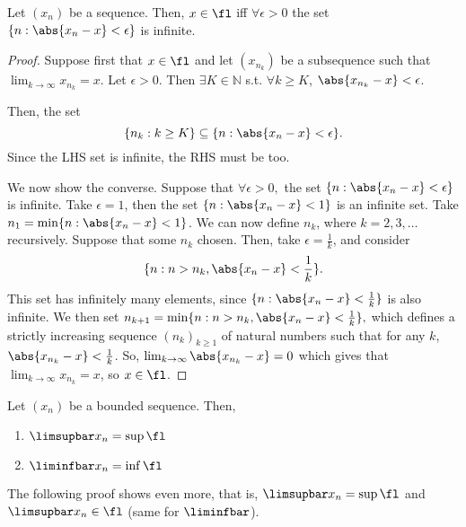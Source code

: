 \documentclass[12pt]{article}
\begin{document}
\begin{proposition}\label{prop:limitpointinifinite}
  Let $(x_n)$ be a sequence. Then, $x \in \fl$ iff $\forall \epsilon > 0$ the set $\{n : \abs{x_n - x} < \epsilon\}$ is infinite.
\end{proposition}

\begin{proof}
  Suppose first that $x \in \fl$ and let $(x_{n_k})$ be a subsequence such that $\lim_{k\to\infty} x_{n_k} = x$. Let $\epsilon > 0$. Then $\exists K \in \mathbb{N}$ s.t. $\forall k \geq K$, $\abs{x_{n_k} - x} < \epsilon$.

  Then, the set \[
  \{n_k : k \geq K\}   \subseteq \{n : \abs{x_n - x} < \epsilon\}.
  \]
  Since the LHS set is infinite, the RHS must be too.

  We now show the converse. Suppose that $\forall \epsilon > 0,$ the set $\{n : \abs{x_{n} - x} < \epsilon\}$ is infinite. %
  Take $\epsilon = 1$, then the set $\{n : \abs{x_n - x} < 1\}$ is an infinite set. Take $n_1 = \min \{n : \abs{x_n - x} < 1\}$. We can now define $n_k$, where $k = 2,3,\dots$ recursively. Suppose that some $n_k$ chosen. Then, take $\epsilon = \frac{1}{k}$, and consider \[
  \{n : n > n_k, \abs{x_n - x} < \frac{1}{k}\}.  
  \]
  This set has infinitely many elements, since $\{n : \abs{x_n - x} < \frac{1}{k}\}$ is also infinite. %
  We then set $n_{k+1} = \min \{n : n > n_k, \abs{x_n - x} < \frac{1}{k}\},$ which defines a strictly increasing sequence $(n_k)_{k \geq 1}$ of natural numbers such that for any $k$, $\abs{x_{n_k} - x} < \frac{1}{k}$. So, $\lim_{k\to\infty} \abs{x_{n_k} - x} = 0$ which gives that $\lim_{k\to\infty} x_{n_k} = x$, so $x \in \fl$.
\end{proof}

\begin{theorem}\label{thm:limsupliminflimitpoints}
  Let $(x_n)$ be a bounded sequence. Then, \begin{enumerate}
    \item $\limsupbar x_n = \sup \fl$
    \item $\liminfbar x_n = \inf \fl$
  \end{enumerate}
\end{theorem}

\begin{remark}
  The following proof shows even more, that is, $\limsupbar x_n = \sup \fl$ and $\limsupbar x_n \in \fl$ (same for $\liminfbar$).
\end{remark}
\end{document}

